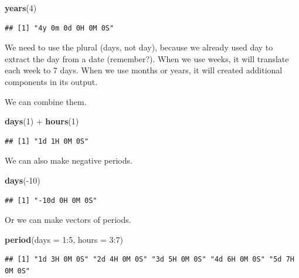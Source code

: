 \documentclass[]{tufte-book}
\newenvironment{Shaded}{}{}
\newcommand{\DataTypeTok}[1]{\textcolor[rgb]{0.56,0.13,0.00}{#1}}
\newcommand{\DecValTok}[1]{\textcolor[rgb]{0.25,0.63,0.44}{#1}}
\newcommand{\KeywordTok}[1]{\textcolor[rgb]{0.00,0.44,0.13}{\textbf{#1}}}
\newcommand{\NormalTok}[1]{#1}
\newcommand{\OperatorTok}[1]{\textcolor[rgb]{0.40,0.40,0.40}{#1}}
\newcommand{\StringTok}[1]{\textcolor[rgb]{0.25,0.44,0.63}{#1}}
\begin{document}
\begin{Shaded}
\begin{Highlighting}[]
\KeywordTok{years}\NormalTok{(}\DecValTok{4}\NormalTok{)}
\end{Highlighting}
\end{Shaded}

\begin{verbatim}
## [1] "4y 0m 0d 0H 0M 0S"
\end{verbatim}

We need to use the plural (days, not day), because we already used day to extract the day from a date (remember?). When we use weeks, it will translate each week to 7 days. When we use months or years, it will created additional components in its output.

We can combine them.

\begin{Shaded}
\begin{Highlighting}[]
\KeywordTok{days}\NormalTok{(}\DecValTok{1}\NormalTok{) }\OperatorTok{+}\StringTok{ }\KeywordTok{hours}\NormalTok{(}\DecValTok{1}\NormalTok{)}
\end{Highlighting}
\end{Shaded}

\begin{verbatim}
## [1] "1d 1H 0M 0S"
\end{verbatim}

We can also make negative periods.

\begin{Shaded}
\begin{Highlighting}[]
\KeywordTok{days}\NormalTok{(}\OperatorTok{-}\DecValTok{10}\NormalTok{)}
\end{Highlighting}
\end{Shaded}

\begin{verbatim}
## [1] "-10d 0H 0M 0S"
\end{verbatim}

Or we can make vectors of periods.

\begin{Shaded}
\begin{Highlighting}[]
\KeywordTok{period}\NormalTok{(}\DataTypeTok{days =} \DecValTok{1}\OperatorTok{:}\DecValTok{5}\NormalTok{, }\DataTypeTok{hours =} \DecValTok{3}\OperatorTok{:}\DecValTok{7}\NormalTok{)}
\end{Highlighting}
\end{Shaded}

\begin{verbatim}
## [1] "1d 3H 0M 0S" "2d 4H 0M 0S" "3d 5H 0M 0S" "4d 6H 0M 0S" "5d 7H 0M 0S"
\end{verbatim}
\end{document}
